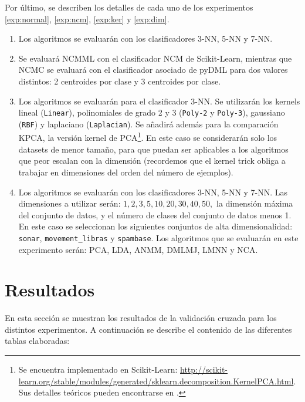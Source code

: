 Por último, se describen los detalles de cada uno de los experimentos \ref{exp:normal}, \ref{exp:ncm}, \ref{exp:ker} y \ref{exp:dim}.
\begin{enumerate}
    \item Los algoritmos se evaluarán con los clasificadores 3-NN, 5-NN y 7-NN.
    \item Se evaluará NCMML con el clasificador NCM de Scikit-Learn, mientras que NCMC se evaluará con el clasificador asociado de pyDML para dos valores distintos: 2 centroides por clase y 3 centroides por clase.
    \item Los algoritmos se evaluarán para el clasificador 3-NN. Se utilizarán los kernels lineal (\texttt{Linear}), polinomiales de grado 2 y 3 (\texttt{Poly-2} y \texttt{Poly-3}), gaussiano (\texttt{RBF}) y laplaciano (\texttt{Laplacian}). Se añadirá además para la comparación KPCA, la versión kernel de PCA\footnote{Se encuentra implementado en Scikit-Learn: \url{http://scikit-learn.org/stable/modules/generated/sklearn.decomposition.KernelPCA.html}. Sus detalles teóricos pueden encontrarse en \cite{kpca}.}. En este caso se considerarán solo los datasets de menor tamaño, para que puedan ser aplicables a los algoritmos que peor escalan con la dimensión (recordemos que el kernel trick obliga a trabajar en dimensiones del orden del número de ejemplos).
    \item Los algoritmos se evaluarán con los clasificadores 3-NN, 5-NN y 7-NN. Las dimensiones a utilizar serán: $1, 2, 3, 5, 10, 20, 30, 40, 50, $ la dimensión máxima del conjunto de datos, y el número de clases del conjunto de datos menos 1. En este caso se seleccionan los siguientes conjuntos de alta dimensionalidad: \texttt{sonar}, \texttt{movement\_libras} y \texttt{spambase}. Los algoritmos que se evaluarán en este experimento serán: PCA, LDA, ANMM, DMLMJ, LMNN y NCA.
\end{enumerate}

\section{Resultados}

En esta sección se muestran los resultados de la validación cruzada para los distintos experimentos. A continuación se describe el contenido de las diferentes tablas elaboradas:

